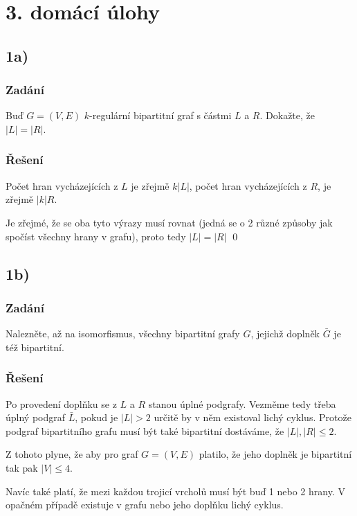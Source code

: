 \documentclass[../main.tex]{subfiles}
\begin{document}
\section{3. domácí úlohy}

\subsection{1a)}
\subsubsection*{Zadání}
Buď $G=(V,E)$ $k$-regulární bipartitní graf s částmi $L$ a $R$. Dokažte, že $|L|=|R|$.

\subsubsection*{Řešení}

Počet hran vycházejících z $L$ je zřejmě $k |L|$, počet hran vycházejících z $R$, je zřejmě $|k|R$.

Je zřejmé, že se oba tyto výrazy musí rovnat (jedná se o 2 různé způsoby jak spočíst všechny hrany v grafu), proto tedy $|L| = |R|$
\qed


\subsection{1b)}
\subsubsection*{Zadání}
Nalezněte, až na isomorfismus, všechny bipartitní grafy $G$, jejichž doplněk $\bar{G}$ je též bipartitní.

\subsubsection*{Řešení}

Po provedení doplňku se z $L$ a $R$ stanou úplné podgrafy. Vezměme tedy třeba úplný podgraf $\bar{L}$, 
pokud je $|L|>2$ určitě by v něm existoval lichý cyklus. 
Protože podgraf bipartitního grafu musí být také bipartitní dostáváme, že
$|L|, |R| \leq 2$. 

Z tohoto plyne, že aby pro  graf $G=(V,E)$ platilo, že jeho doplněk je bipartitní tak pak $|V|\leq 4$.

Navíc také platí, že mezi každou trojicí vrcholů musí být buď 1 nebo 2 hrany. V opačném případě existuje v grafu nebo jeho doplňku lichý cyklus.
\end{document}
